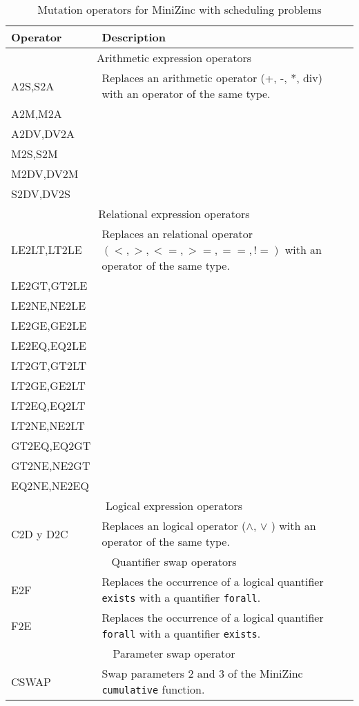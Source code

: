 \begin{table*}[htb!]
    \caption{Mutation operators for MiniZinc with scheduling problems}
    \label{tab:Op-MiniZinc}
    \centering
    \small
    \begin{tabular}{l p{}r}
    \toprule
      Operator & \hspace{3cm} Description \\
     \midrule
     \multicolumn{2}{c}{Arithmetic expression operators} \\
     \midrule
     A2S,S2A & Replaces an arithmetic operator (+, -, *, div) with an operator of the same type.\\
     A2M,M2A\\
     A2DV,DV2A\\
     M2S,S2M\\
     M2DV,DV2M\\
     S2DV,DV2S\\
     \midrule
     \multicolumn{2}{c}{Relational expression operators} \\
     \midrule
     LE2LT,LT2LE & Replaces an relational operator $(<, >, <=, >=, ==, !=)$ with an operator of the same type.\\
     LE2GT,GT2LE\\
     LE2NE,NE2LE \\
     LE2GE,GE2LE \\
     LE2EQ,EQ2LE\\
     LT2GT,GT2LT\\
     LT2GE,GE2LT\\
     LT2EQ,EQ2LT\\
     LT2NE,NE2LT\\
     GT2EQ,EQ2GT\\
     GT2NE,NE2GT\\
     EQ2NE,NE2EQ\\

     \midrule
     \multicolumn{2}{c}{Logical expression operators} \\
     \midrule
     C2D y  D2C & Replaces an logical operator ($\wedge$, $\vee$ ) with an operator of the same type.\\
     \midrule
     \multicolumn{2}{c}{Quantifier swap operators} \\
      \midrule
      E2F & Replaces the occurrence of a logical quantifier \texttt{exists}  with a quantifier \texttt{forall}.\\
      F2E & Replaces the occurrence of a logical quantifier \texttt{forall} with a quantifier  \texttt{exists}.\\
     \midrule
      \multicolumn{2}{c}{Parameter swap operator} \\
     \midrule
     CSWAP & Swap parameters 2 and 3 of the MiniZinc \texttt{cumulative} function. \\
    \bottomrule
    \end{tabular}
    \end{table*}

